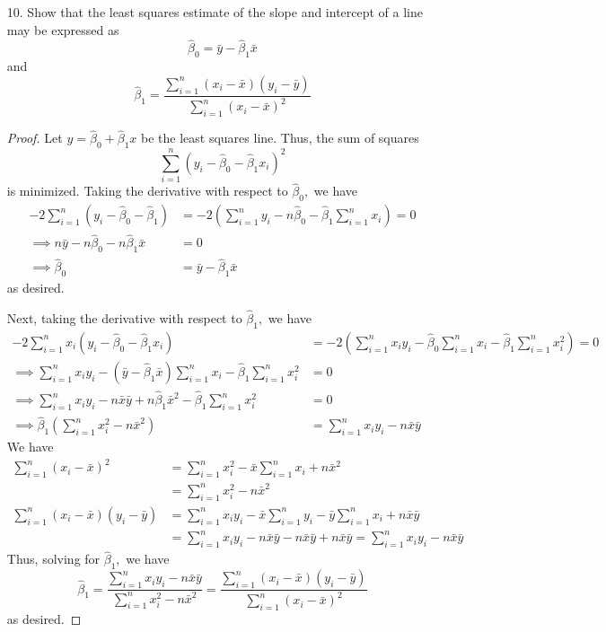 \documentclass{article}
\begin{document}
\begin{itemize}
\begin{enumerate}[a.]
		\end{enumerate}

		\newpage
	\item[10.] Show that the least squares estimate of the slope and intercept of a line may be expressed as \[\hat\beta_0=\bar y-\hat\beta_1\bar x\] and \[\hat\beta_1=\frac{\displaystyle \sum_{i=1}^{n} (x_i-\bar x)(y_i-\bar y)}{\displaystyle \sum_{i=1}^{n} (x_i-\bar x)^2}\]
		\begin{proof}
			Let $y=\hat\beta_0 + \hat\beta_1x$ be the least squares line. Thus, the sum of squares
			\[\sum_{i=1}^{n}(y_i - \hat\beta_0-\hat\beta_1x_i)^2\]
			is minimized. Taking the derivative with respect to $\hat\beta_0,$ we have 
			\begin{align*}
				-2\sum_{i=1}^{n} (y_i-\hat\beta_0-\hat\beta_1) &= -2\left( \sum_{i=1}^{n} y_i -n\hat\beta_0 - \hat\beta_1\sum_{i=1}^{n} x_i \right) = 0 \\
				\implies n\bar y - n\hat\beta_0 - n\hat\beta_1 \bar x &= 0 \\
				\implies \hat\beta_0 &= \bar y - \hat\beta_1\bar x
			\end{align*}
			as desired.

			Next, taking the derivative with respect to $\hat\beta_1,$ we have
			\begin{align*}
				-2\sum_{i=1}^{n}x_i(y_i-\hat\beta_0-\hat\beta_1 x_i) &= -2\left( \sum_{i=1}^{n} x_iy_i - \hat\beta_0 \sum_{i=1}^{n} x_i - \hat\beta_1\sum_{i=1}^{n} x_i^2 \right) = 0 \\
				\implies \sum_{i=1}^{n} x_iy_i - (\bar y - \hat\beta_1\bar x)\sum_{i=1}^{n} x_i - \hat\beta_1 \sum_{i=1}^{n}x_i^2 &= 0 \\
				\implies \sum_{i=1}^{n} x_iy_i - n\bar x\bar y + n\hat\beta_1\bar x^2 - \hat\beta_1 \sum_{i=1}^{n} x_i^2 &= 0 \\
				\implies \hat\beta_1 \left(\sum_{i=1}^{n} x_i^2 -n\bar x^2\right) &= \sum_{i=1}^{n} x_iy_i-n\bar x\bar y
			\end{align*}
			We have
			\begin{align*}
				\sum_{i=1}^{n} (x_i-\bar x)^2 &= \sum_{i=1}^{n} x_i^2 - \bar x\sum_{i=1}^{n} x_i + n\bar x^2 \\
				&= \sum_{i=1}^{n} x_i^2 - n\bar x^2 \\
				\sum_{i=1}^{n} (x_i-\bar x)(y_i-\bar y) &= \sum_{i=1}^{n} x_iy_i - \bar x\sum_{i=1}^{n} y_i - \bar y\sum_{i=1}^{n} x_i + n\bar x\bar y \\
				&= \sum_{i=1}^{n} x_iy_i - n\bar x\bar y - n\bar x\bar y + n\bar x\bar y = \sum_{i=1}^{n} x_iy_i - n\bar x\bar y
			\end{align*}
			Thus, solving for $\hat\beta_1,$ we have 
			\[\hat\beta_1 = \frac{\displaystyle\sum_{i=1}^{n} x_iy_i-n\bar x\bar y}{\displaystyle\sum_{i=1}^{n} x_i^2 - n\bar x^2} = \frac{\displaystyle\sum_{i=1}^{n} (x_i-\bar x)(y_i-\bar y)}{\displaystyle\sum_{i=1}^{n} (x_i-\bar x)^2}\]
			as desired.
		\end{proof}


\end{itemize}
\end{document}
